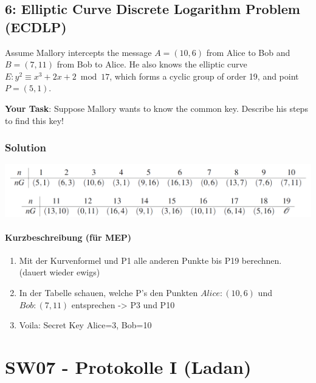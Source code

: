 \documentclass[11pt]{article}
\begin{document}
\newpage

    \hypertarget{elliptic-curve-discrete-logarithm-problem-ecdlp}{%
\subsection{6: Elliptic Curve Discrete Logarithm Problem
(ECDLP)}\label{elliptic-curve-discrete-logarithm-problem-ecdlp}}

Assume Mallory intercepts the message \(A = (10,6)\) from Alice to Bob
and \(B = (7,11)\) from Bob to Alice. He also knows the elliptic curve
\(E : y^2 \equiv x^3 +2x+2 \bmod 17\), which forms a cyclic group of
order 19, and point \(P = (5,1)\).

\textbf{Your Task}: Suppose Mallory wants to know the common key.
Describe his steps to find this key!

\hypertarget{solution}{%
\subsubsection{Solution}\label{solution}}

\begin{center}
	\includegraphics[scale=0.8]{img/p19Tabelle.png}
\end{center}

\hypertarget{kurzbeschreibung-fuxfcr-mep}{%
\paragraph{Kurzbeschreibung (für
MEP)}\label{kurzbeschreibung-fuxfcr-mep}}

\begin{enumerate}
\def\labelenumi{\arabic{enumi}.}
\item
  Mit der Kurvenformel und P1 alle anderen Punkte bis P19 berechnen.
  (dauert wieder ewigs)
\item
  In der Tabelle schauen, welche P's den Punkten \(Alice: (10,6)\) und
  \(Bob: (7, 11)\) entsprechen -\textgreater{} P3 und P10
\item
  Voila: Secret Key Alice=3, Bob=10
\end{enumerate}

    

    \hypertarget{sw07---protokolle-i-ladan}{%
\section{SW07 - Protokolle I (Ladan)}\label{sw07---protokolle-i-ladan}}
\end{document}
